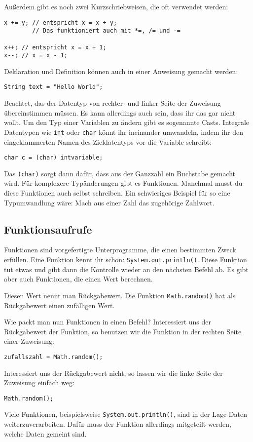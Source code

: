 Außerdem gibt es noch zwei Kurzschriebweisen, die oft verwendet werden:
\begin{lstlisting}
x += y; // entspricht x = x + y;
        // Das funktioniert auch mit *=, /= und -=

x++; // entspricht x = x + 1;
x--; // x = x - 1;
\end{lstlisting}
Deklaration und Definition können auch in einer Anweisung gemacht werden: 
\begin{lstlisting}
String text = "Hello World";
\end{lstlisting}
Beachtet, das der Datentyp von rechter- und linker Seite der Zuweisung übereinstimmen müssen. Es kann allerdings auch sein, dass ihr das gar nicht wollt.
Um den Typ einer Variablen zu ändern gibt es sogenannte Casts. Integrale Datentypen wie \lstinline$int$ oder \lstinline$char$ könnt ihr ineinander umwandeln, indem ihr den eingeklammerten Namen des Zieldatentyps vor die Variable schreibt: 
\begin{lstlisting}
char c = (char) intvariable;
\end{lstlisting}
Das \lstinline$(char)$ sorgt dann dafür, dass aus der Ganzzahl ein Buchstabe gemacht wird.
Für komplexere Typänderungen gibt es Funktionen. Manchmal musst du diese Funktionen auch selbst schreiben. Ein schwieriges Beispiel für so eine Typumwandlung wäre: Mach aus einer Zahl das zugehörige Zahlwort.

\subsection{Funktionsaufrufe}
Funktionen sind vorgefertigte Unterprogramme, die einen bestimmten Zweck erfüllen. Eine Funktion kennt ihr schon: \lstinline$System.out.println()$.
Diese Funktion tut etwas und gibt dann die Kontrolle wieder an den nächsten Befehl ab. Es gibt aber auch Funktionen, die einen Wert berechnen.

Diesen Wert nennt man Rückgabewert. Die Funktion \lstinline$Math.random()$ hat als Rückgabewert einen zufälligen Wert.

Wie packt man nun Funktionen in einen Befehl? Interessiert uns der Rückgabewert der Funktion, so benutzen wir die Funktion in der rechten Seite einer Zuweisung: 
\begin{lstlisting}
zufallszahl = Math.random();
\end{lstlisting}
Interessiert uns der Rückgabewert nicht, so lassen wir die linke Seite der Zuweisung einfach weg:
\begin{lstlisting}
Math.random();
\end{lstlisting}
Viele Funktionen, beispielsweise \lstinline$System.out.println()$, sind in der Lage Daten weiterzuverarbeiten. Dafür muss der Funktion allerdings mitgeteilt werden, welche Daten gemeint sind.

